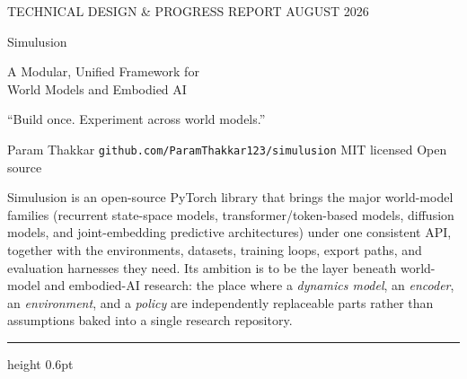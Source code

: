 \documentclass[10pt,a4paper]{article}
\newcommand{\sectionhead}[1]{\vspace{1mm}{\large\displayfont\color{ink} #1}\par\vspace{2mm}}
\begin{document}
\thispagestyle{fancy}


\vspace*{5mm}
{\color{white}
  {\footnotesize\displayfont\color{accent!35!white}TECHNICAL DESIGN \& PROGRESS REPORT \quad\textbullet\quad AUGUST 2026}\par
  \vspace{6mm}
  {\fontsize{40}{44}\selectfont\displayfont Simulusion}\par
  \vspace{3mm}
  {\fontsize{14.5}{18}\selectfont\lightfont\color{white}A Modular, Unified Framework for\\World Models and Embodied AI}\par
  \vspace{7mm}
  {\large\displayfont\color{accent!35!white}“Build once. Experiment across world models.”}\par
  \vspace{6mm}
  {\footnotesize\color{white!62!ink}Param Thakkar \quad\textbullet\quad \texttt{github.com/ParamThakkar123/simulusion} \quad\textbullet\quad MIT licensed \quad\textbullet\quad Open source}
}
\vspace{12mm}

\sectionhead{What Simulusion is}
Simulusion is an open-source PyTorch library that brings the major world-model families (recurrent
state-space models, transformer/token-based models, diffusion models, and joint-embedding predictive
architectures) under one consistent API, together with the environments, datasets, training loops,
export paths, and evaluation harnesses they need. Its ambition is to be the layer beneath
world-model and embodied-AI research: the place where a \emph{dynamics model}, an \emph{encoder},
an \emph{environment}, and a \emph{policy} are independently replaceable parts rather than
assumptions baked into a single research repository.

\vspace{3mm}
{\color{rule}\hrule height 0.6pt}
\vspace{3.5mm}
\end{document}
